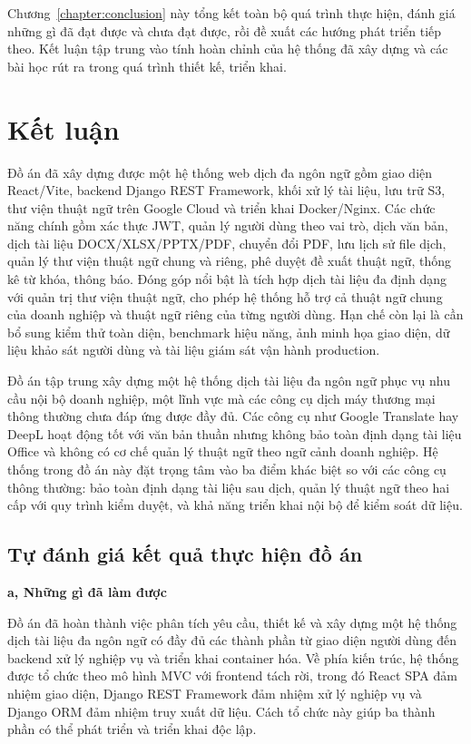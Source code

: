 \documentclass[../DoAn.tex]{subfiles}
\begin{document}
Chương~\ref{chapter:conclusion} này tổng kết toàn bộ quá trình thực hiện, đánh giá những gì đã đạt được và chưa đạt được, rồi đề xuất các hướng phát triển tiếp theo. Kết luận tập trung vào tính hoàn chỉnh của hệ thống đã xây dựng và các bài học rút ra trong quá trình thiết kế, triển khai.

\section{Kết luận}
Đồ án đã xây dựng được một hệ thống web dịch đa ngôn ngữ gồm giao diện React/Vite, backend Django REST Framework, khối xử lý tài liệu, lưu trữ S3, thư viện thuật ngữ trên Google Cloud và triển khai Docker/Nginx. Các chức năng chính gồm xác thực JWT, quản lý người dùng theo vai trò, dịch văn bản, dịch tài liệu DOCX/XLSX/PPTX/PDF, chuyển đổi PDF, lưu lịch sử file dịch, quản lý thư viện thuật ngữ chung và riêng, phê duyệt đề xuất thuật ngữ, thống kê từ khóa, thông báo. Đóng góp nổi bật là tích hợp dịch tài liệu đa định dạng với quản trị thư viện thuật ngữ, cho phép hệ thống hỗ trợ cả thuật ngữ chung của doanh nghiệp và thuật ngữ riêng của từng người dùng. Hạn chế còn lại là cần bổ sung kiểm thử toàn diện, benchmark hiệu năng, ảnh minh họa giao diện, dữ liệu khảo sát người dùng và tài liệu giám sát vận hành production.

Đồ án tập trung xây dựng một hệ thống dịch tài liệu đa ngôn ngữ phục vụ nhu cầu nội bộ doanh nghiệp, một lĩnh vực mà các công cụ dịch máy thương mại thông thường chưa đáp ứng được đầy đủ. Các công cụ như Google Translate hay DeepL hoạt động tốt với văn bản thuần nhưng không bảo toàn định dạng tài liệu Office và không có cơ chế quản lý thuật ngữ theo ngữ cảnh doanh nghiệp. Hệ thống trong đồ án này đặt trọng tâm vào ba điểm khác biệt so với các công cụ thông thường: bảo toàn định dạng tài liệu sau dịch, quản lý thuật ngữ theo hai cấp với quy trình kiểm duyệt, và khả năng triển khai nội bộ để kiểm soát dữ liệu.

\subsection{Tự đánh giá kết quả thực hiện đồ án}

\textbf{a, Những gì đã làm được}

Đồ án đã hoàn thành việc phân tích yêu cầu, thiết kế và xây dựng một hệ thống dịch tài liệu đa ngôn ngữ có đầy đủ các thành phần từ giao diện người dùng đến backend xử lý nghiệp vụ và triển khai container hóa. Về phía kiến trúc, hệ thống được tổ chức theo mô hình MVC với frontend tách rời, trong đó React SPA đảm nhiệm giao diện, Django REST Framework đảm nhiệm xử lý nghiệp vụ và Django ORM đảm nhiệm truy xuất dữ liệu. Cách tổ chức này giúp ba thành phần có thể phát triển và triển khai độc lập.
\end{document}

